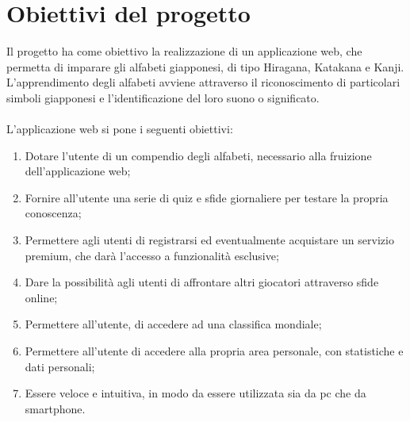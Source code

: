 \section{Obiettivi del progetto}
Il progetto ha come obiettivo la realizzazione di un applicazione web, che permetta di imparare gli alfabeti giapponesi, di tipo Hiragana, Katakana e Kanji. L’apprendimento degli alfabeti avviene attraverso il riconoscimento di particolari simboli giapponesi e l’identificazione del loro suono o significato. \\
\\
L’applicazione web si pone i seguenti obiettivi: 
\begin{enumerate}
    \item Dotare l’utente di un compendio degli alfabeti, necessario alla fruizione dell’applicazione web; \label{o1}
    
    \item Fornire all’utente una serie di quiz e sfide giornaliere per testare la propria conoscenza; \label{o2}
    
    \item Permettere agli utenti di registrarsi ed eventualmente acquistare un servizio premium, che darà l'accesso a funzionalità esclusive; \label{o3}
    
    \item Dare la possibilità agli utenti di affrontare altri giocatori attraverso sfide online; \label{o4}
    
    \item Permettere all’utente, di accedere ad una classifica mondiale; \label{o5}
    
    \item Permettere all'utente di accedere alla propria area personale, con statistiche e dati personali; \label{o6}
    
    \item Essere veloce e intuitiva, in modo da essere utilizzata sia da pc che da smartphone. \label{o7}
\end{enumerate}